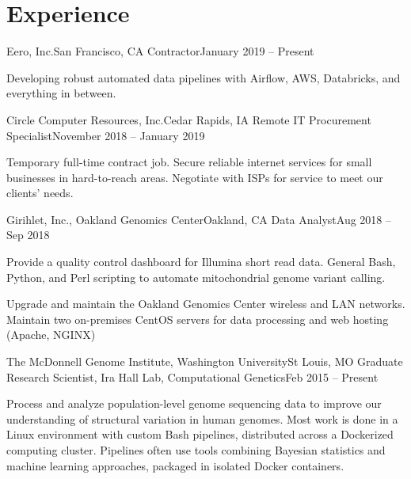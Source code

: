 \section{Experience}
    \resumeSubHeadingListStart
    
    	    \resumeSubheading
	    {Eero, Inc.}{San Francisco, CA}
	    {Contractor}{January 2019 -- Present}
	    
	    \resumeItemListStart
	    
		{Developing robust automated data pipelines with Airflow, AWS, Databricks, and everything in between.}
		
	\resumeItemListEnd
	
    	    \resumeSubheading
	    {Circle Computer Resources, Inc.}{Cedar Rapids, IA}
	    {Remote IT Procurement Specialist}{November 2018 -- January 2019}
	    
	    \resumeItemListStart
	    
		{Temporary full-time contract job. Secure reliable internet services for small businesses in hard-to-reach areas. Negotiate with ISPs for service to meet our clients' needs.}
		
	\resumeItemListEnd
	
	    \resumeSubheading
	    {Girihlet, Inc., Oakland Genomics Center}{Oakland, CA}
	    {Data Analyst}{Aug 2018 -- Sep 2018}
	    
	    \resumeItemListStart
	    
	    	{Provide a quality control dashboard for Illumina short read data. General Bash, Python, and Perl scripting to automate mitochondrial genome variant calling.}
	    		
	    	{Upgrade and maintain the Oakland Genomics Center wireless and LAN networks. Maintain two on-premises CentOS servers for data processing and web hosting (Apache, NGINX)}
		
	\resumeItemListEnd
     
        \resumeSubheading
        {The McDonnell Genome Institute, Washington University}{St Louis, MO}
        {Graduate Research Scientist, Ira Hall Lab, Computational Genetics}{Feb 2015 -- Present}

        \resumeItemListStart

            {Process and analyze population-level genome sequencing data to improve our understanding of structural variation in human genomes. Most work is done in a Linux environment with custom Bash pipelines, distributed across a Dockerized computing cluster. Pipelines often use tools combining Bayesian statistics and machine learning approaches, packaged in isolated Docker containers.}
            
